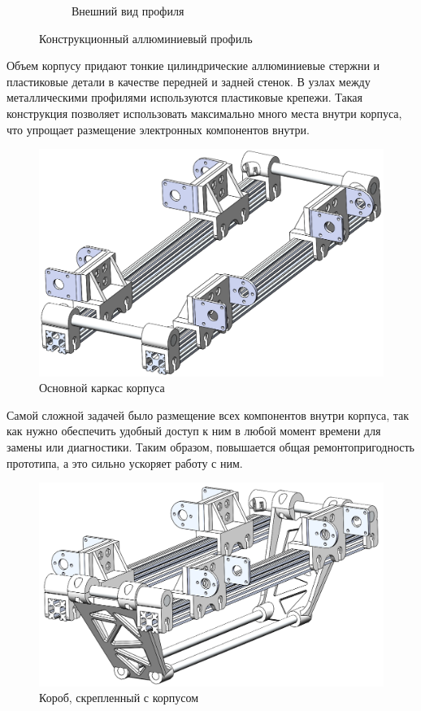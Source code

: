 \begin{figure}[ht]
\begin{subfigure}[b]{0.45\textwidth}
        \caption{Внешний вид профиля}
    \end{subfigure}
     
    \caption{Конструкционный аллюминиевый профиль}
    \label{}
\end{figure}

Объем корпусу придают тонкие цилиндрические аллюминиевые стержни и пластиковые детали в качестве передней и задней стенок. В узлах между металлическими профилями используются пластиковые крепежи. Такая конструкция позволяет использовать максимально много места внутри корпуса, что упрощает размещение электронных компонентов внутри.

\begin{figure}[h]
    \centering
    \includegraphics[scale=0.55]{chapter_mechanics_construction/figure10.png}
    \caption{Основной каркас корпуса}
    \label{}
\end{figure}

\newpage
Самой сложной задачей было размещение всех компонентов внутри корпуса, так как нужно обеспечить удобный доступ к ним в любой момент времени для замены или диагностики. Таким образом, повышается общая ремонтопригодность прототипа, а это сильно ускоряет работу с ним.

\begin{figure}[h]
    \centering
    \includegraphics[scale=0.57]{chapter_mechanics_construction/figure13.png}
    \caption{Короб, скрепленный с корпусом}
    \label{}
\end{figure}

